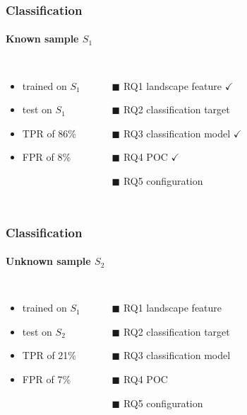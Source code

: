 \begin{frame}
	\frametitle{Classification}
	\framesubtitle{Known sample $S_1$}
	
	\begin{columns}[c]
		
		
		\begin{itemize}
			\item trained on $S_1$
			\item test on $S_1$
			\item TPR of 86\%
			\item FPR of 8\%
		\end{itemize}
		
		
		\begin{itemize}
			\item[$\blacksquare$] RQ1 landscape feature $\checkmark$
			\item[\textcolor{hni-gray}{$\blacksquare$}] \textcolor{hni-gray}{RQ2 classification target}
			\item[$\blacksquare$] RQ3 classification model $\checkmark$
			\item[$\blacksquare$] RQ4 POC $\checkmark$
			\item[\textcolor{hni-gray}{$\blacksquare$}] \textcolor{hni-gray}{RQ5 configuration}
		\end{itemize}	
		
	\end{columns}
	
\end{frame}

\begin{frame}
	\frametitle{Classification}
	\framesubtitle{Unknown sample $S_2$}
	
	\begin{columns}[c]
		
		\column{.45\textwidth}
		
		\begin{itemize}
			\item trained on $S_1$
			\item test on $S_2$
			\item TPR of 21\%
			\item FPR of 7\%
		\end{itemize}
		
		\column{.45\textwidth}
		
		\begin{itemize}
			\item[$\blacksquare$] RQ1 landscape feature \xmark
			\item[\textcolor{hni-gray}{$\blacksquare$}] \textcolor{hni-gray}{RQ2 classification target}
			\item[$\blacksquare$] RQ3 classification model \xmark
			\item[$\blacksquare$] RQ4 POC \xmark
			\item[\textcolor{hni-gray}{$\blacksquare$}] \textcolor{hni-gray}{RQ5 configuration}
		\end{itemize}	
		
	\end{columns}
	
\end{frame}

